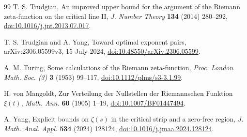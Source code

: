 \documentclass[11pt,reqno]{amsart}
\numberwithin{equation}{section}
\theoremstyle{definition}
\theoremstyle{remark}
\begin{document}
\begin{thebibliography}{99}
 T. S. Trudgian, An improved upper bound for the argument of the Riemann zeta-function on the critical line II, \textit{J. Number Theory} \textbf{134} (2014) 280--292, \href{https://doi.org/10.1016/j.jnt.2013.07.017}{doi:10.1016/j.jnt.2013.07.017}.

 T. S. Trudgian and A. Yang, Toward optimal exponent pairs, arXiv:2306.05599v3, 15 July 2024, \href{https://doi.org/10.48550/arXiv.2306.05599}{doi:10.48550/arXiv.2306.05599}.

 A. M. Turing, Some calculations of the Riemann zeta-function, \textit{Proc. London Math. Soc. (3)} \textbf{3} (1953) 99--117, \href{https://doi.org/10.1112/plms/s3-3.1.99}{doi:10.1112/plms/s3-3.1.99}.

 H. von Mangoldt, Zur Verteilung der Nullstellen der Riemannschen Funktion $\xi(t)$, \textit{Math. Ann.} \textbf{60} (1905) 1--19, \href{https://doi.org/10.1007/BF01447494}{doi:10.1007/BF01447494}.

 A. Yang, Explicit bounds on $\zeta(s)$ in the critical strip and a zero-free region, \textit{J. Math. Anal. Appl.} \textbf{534} (2024) 128124, \href{https://doi.org/10.1016/j.jmaa.2024.128124}{doi:10.1016/j.jmaa.2024.128124}.

\end{thebibliography}

\appendix
\end{document}
